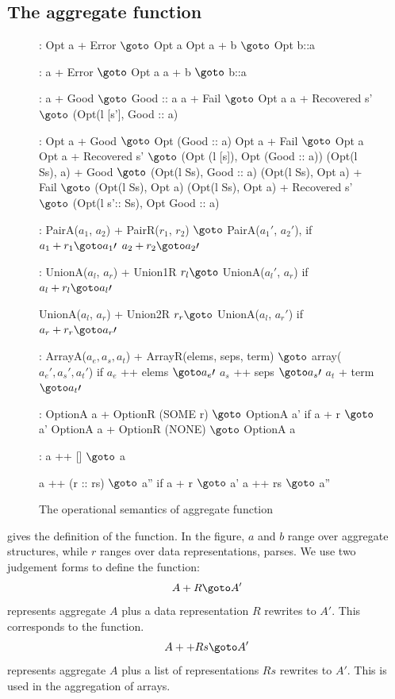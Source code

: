 \subsection{The aggregate function}
\begin{figure}[ht]
\centering
\begin{code}
\cdmath
{}:
  Opt a + Error $\goto$ Opt a
  Opt a + b     $\goto$ Opt b::a

:
  a + Error $\goto$ Opt a
  a + b     $\goto$ b::a

: 
  a + Good $\goto$ Good :: a
  a + Fail $\goto$ Opt a
  a + Recovered s' $\goto$ (Opt(l [s'], Good :: a)

: 
  Opt a + Good $\goto$ Opt (Good :: a)
  Opt a + Fail $\goto$ Opt a
  Opt a + Recovered s' $\goto$ (Opt (l [s]), Opt (Good :: a))
  (Opt(l Ss), a) + Good $\goto$ (Opt(l Ss), Good :: a)
  (Opt(l Ss), Opt a) + Fail $\goto$ (Opt(l Ss), Opt a)
  (Opt(l Ss), Opt a) + Recovered s' $\goto$ (Opt(l s':: Ss), Opt Good :: a)

:
  PairA($a_1$, $a_2$) + PairR($r_1$, $r_2$) $\goto$ PairA($a_1\prime$, $a_2\prime$),
  if 
	$a_1 + r_1 \goto a_1\prime$
	$a_2 + r_2 \goto a_2\prime$


:
  UnionA($a_l$, $a_r$) + Union1R $r_l \goto$ UnionA($a_l\prime$, $a_r$)
  if $a_l + r_l \goto a_l\prime$

  UnionA($a_l$, $a_r$) + Union2R $r_r \goto$ UnionA($a_l$, $a_r\prime$)
  if $a_r + r_r \goto a_r\prime$


:
  ArrayA($a_e, a_s, a_t$) + ArrayR(elems, seps, term) $\goto$ array($a_e\prime, a_s\prime, a_t\prime$)
  if 
	$a_e$ ++ elems $\goto a_e\prime$
	$a_s$ ++ seps  $\goto a_s\prime$
	$a_t$ +  term  $\goto a_t\prime$

:
  OptionA a + OptionR (SOME r) $\goto$ OptionA a' if a + r $\goto$ a'
  OptionA a + OptionR (NONE) $\goto$ OptionA a 

:
  a ++ [] $\goto$ a

  a ++ (r :: rs) $\goto$ a'' 
  if 
	a + r $\goto$ a'
	a ++ rs $\goto$ a''

\end{code}
\caption{The operational semantics of aggregate function}
\label{fig:aggr-sem}
\end{figure}
 gives the definition of the 
function.
In the figure, $a$ and $b$ range over aggregate structures, while
$r$ ranges over data representations, \ie{} parses.
We use two judgement forms to define the  function:
\[A + R \goto A'\]
represents aggregate $A$ plus a data representation $R$ rewrites to $A'$.
This corresponds to the  function.
\[A ++ Rs \goto A'\]
represents aggregate $A$ plus a list of representations $Rs$ rewrites
to $A'$. This is used in the aggregation of arrays.


